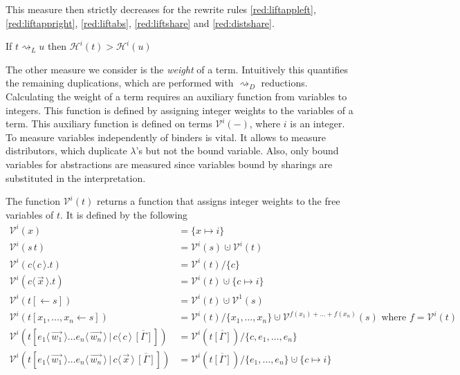 \documentclass[a4paper,UKenglish,cleveref, autoref]{lipics-v2019}
\newcommand{\set}[1]{ \{ #1 \} }
\newcommand{\app}[2]{#1 \, #2}
\newcommand{\fake}[3]{#1 \langle \, #2 \, \rangle . #3}
\newcommand{\share}[3]{#1 [#2 \leftarrow #3]}
\newcommand{\dist}[5]{#1 [ #2 \, \vert \, \fakedist{#4}{#5} \, #3 ]}
\newcommand{\fakedist}[2]{#1 \langle \, #2 \, \rangle}
\newcommand{\height}[2]{\mathcal{H}^{#1}(#2)}
\newcommand{\weightvar}[2]{\mathcal{V}^{#1}(#2)}
\begin{document}
\noindent This measure then strictly decreases for the rewrite rules \ref{red:liftappleft}, \ref{red:liftappright}, \ref{red:liftabs}, \ref{red:liftshare} and \ref{red:distshare}.

\begin{lemma}
\label{theo:liftingheight}
If $t \rightsquigarrow_{L} u$ then $\height{i}{t} > \height{i}{u}$
\end{lemma}

The other measure we consider is the \emph{weight} of a term. Intuitively this quantifies the remaining duplications, which are performed with $\rightsquigarrow_{D}$ reductions. Calculating the weight of a term requires an auxiliary function from variables to integers. This function is defined by assigning integer weights to the variables of a term. This auxiliary function is defined on terms $\weightvar{i}{-}$, where $i$ is an integer. To measure variables independently of binders is vital. It allows to measure distributors, which duplicate $\lambda$'s but not the bound variable. Also, only bound variables for abstractions are measured since variables bound by sharings are substituted in the interpretation.

\begin{definition}
The function $\weightvar{i}{t}$ returns a function that assigns integer weights to the free variables of $t$. It is defined by the following
\begingroup
\allowdisplaybreaks
\begin{align*}
	\weightvar{i}{x} &= \set{x \mapsto i} \\
	\weightvar{i}{\app{s}{t}} &= \weightvar{i}{s} \cupdot \weightvar{i}{t} \\
	\weightvar{i}{\fake{c}{c}{t}} &= \weightvar{i}{t} / \set{c} \\
	\weightvar{i}{\fake{c}{\vec{x}}{t}} &= \weightvar{i}{t} \cupdot \set{c \mapsto i} \\
	\weightvar{i}{\share{t}{}{s}} &= \weightvar{i}{t} \cupdot \weightvar{1}{s} \\
	\weightvar{i}{\share{t}{x_{1}, \dots, x_{n}}{s}} &= \weightvar{i}{t} / \set{x_{1}, \dots, x_{n}} \cupdot \weightvar{f(x_{1}) + \dots + f(x_{n})}{s} \text{ where } f = \weightvar{i}{t} \\
	\weightvar{i}{\dist{t}{\fakedist{e_{1}}{\vec{w_{1}}} \dots \fakedist{e_{n}}{\vec{w_{n}}}}{\overline{[\Gamma]}}{c}{c}} &= \weightvar{i}{t\overline{[\Gamma]}} / \set{c, e_{1}, \dots, e_{n}} \\
	\weightvar{i}{\dist{t}{\fakedist{e_{1}}{\vec{w_{1}}} \dots \fakedist{e_{n}}{\vec{w_{n}}}}{\overline{[\Gamma]}}{c}{\vec{x}}} &= \weightvar{i}{t\overline{[\Gamma]}} / \set{e_{1}, \dots, e_{n}} \cupdot \set{c \mapsto i}
\end{align*}
\endgroup
\end{definition}
\end{document}
